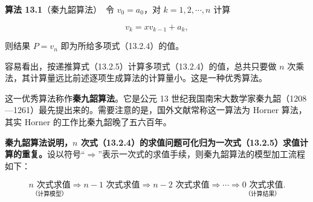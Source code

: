 \documentclass[
  10pt,
  fontset=fandol]{ctexart}
\begin{document}
\textbf{算法 13.1}（秦九韶算法）　令 \(v_0=a_0\)，对 \(k=1,2,\cdots,n\) 计算

\[
v_k=xv_{k-1}+a_k,
\tag{13.2.5}
\]

则结果 \(P=v_n\) 即为所给多项式（13.2.4）的值。

容易看出，按递推算式（13.2.5）计算多项式（13.2.4）的值，总共只要做 \(n\) 次乘法，其计算量远比前述逐项生成算法的计算量小。这是一种优秀算法。

这一优秀算法称作\textbf{秦九韶算法}。它是公元 13 世纪我国南宋大数学家秦九韶（1208---1261）最先提出来的。需要注意的是，国外文献常称这一算法为 Horner 算法，其实 Horner 的工作比秦九韶晚了五六百年。

\textbf{秦九韶算法说明，\(n\) 次式（13.2.4）的求值问题可化归为一次式（13.2.5）求值计算的重复。}设以符号``\(\Rightarrow\)''表示一次式的求值手续，则秦九韶算法的模型加工流程如下：

\[
\underset{\text{（计算模型）}}{n\text{ 次式求值}}
\Rightarrow n-1\text{ 次式求值}
\Rightarrow n-2\text{ 次式求值}
\Rightarrow\cdots\Rightarrow
\underset{\text{（计算结果）}}{0\text{ 次式求值}}.
\]
\end{document}
